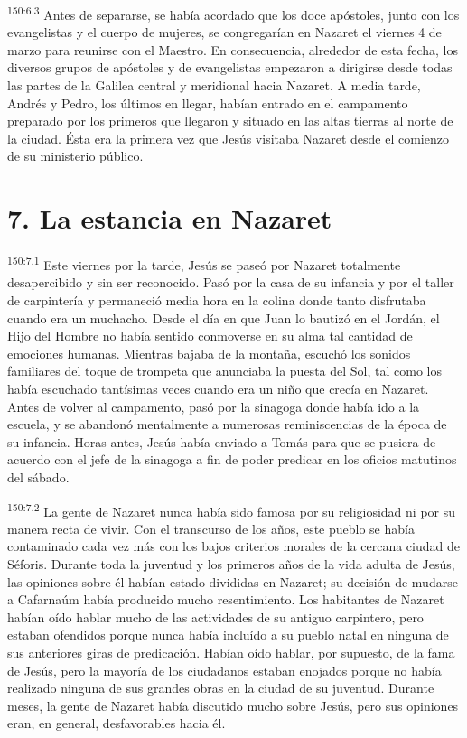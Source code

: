 \par 
\textsuperscript{150:6.3} Antes de separarse, se había acordado que los doce apóstoles, junto con los evangelistas y el cuerpo de mujeres, se congregarían en Nazaret el viernes 4 de marzo para reunirse con el Maestro. En consecuencia, alrededor de esta fecha, los diversos grupos de apóstoles y de evangelistas empezaron a dirigirse desde todas las partes de la Galilea central y meridional hacia Nazaret. A media tarde, Andrés y Pedro, los últimos en llegar, habían entrado en el campamento preparado por los primeros que llegaron y situado en las altas tierras al norte de la ciudad. Ésta era la primera vez que Jesús visitaba Nazaret desde el comienzo de su ministerio público.

\section*{7. La estancia en Nazaret}
\par 
\textsuperscript{150:7.1} Este viernes por la tarde, Jesús se paseó por Nazaret totalmente desapercibido y sin ser reconocido. Pasó por la casa de su infancia y por el taller de carpintería y permaneció media hora en la colina donde tanto disfrutaba cuando era un muchacho. Desde el día en que Juan lo bautizó en el Jordán, el Hijo del Hombre no había sentido conmoverse en su alma tal cantidad de emociones humanas. Mientras bajaba de la montaña, escuchó los sonidos familiares del toque de trompeta que anunciaba la puesta del Sol, tal como los había escuchado tantísimas veces cuando era un niño que crecía en Nazaret. Antes de volver al campamento, pasó por la sinagoga donde había ido a la escuela, y se abandonó mentalmente a numerosas reminiscencias de la época de su infancia. Horas antes, Jesús había enviado a Tomás para que se pusiera de acuerdo con el jefe de la sinagoga a fin de poder predicar en los oficios matutinos del sábado.

\par 
\textsuperscript{150:7.2} La gente de Nazaret nunca había sido famosa por su religiosidad ni por su manera recta de vivir. Con el transcurso de los años, este pueblo se había contaminado cada vez más con los bajos criterios morales de la cercana ciudad de Séforis. Durante toda la juventud y los primeros años de la vida adulta de Jesús, las opiniones sobre él habían estado divididas en Nazaret; su decisión de mudarse a Cafarnaúm había producido mucho resentimiento. Los habitantes de Nazaret habían oído hablar mucho de las actividades de su antiguo carpintero, pero estaban ofendidos porque nunca había incluído a su pueblo natal en ninguna de sus anteriores giras de predicación. Habían oído hablar, por supuesto, de la fama de Jesús, pero la mayoría de los ciudadanos estaban enojados porque no había realizado ninguna de sus grandes obras en la ciudad de su juventud. Durante meses, la gente de Nazaret había discutido mucho sobre Jesús, pero sus opiniones eran, en general, desfavorables hacia él.

